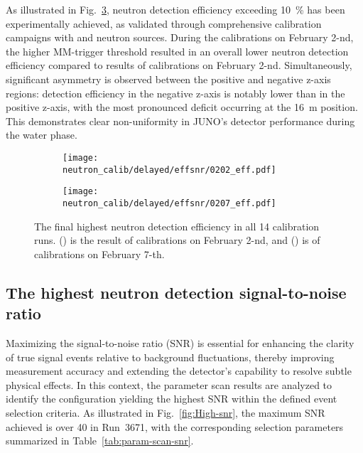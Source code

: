 As illustrated in Fig.~\ref{fig:SummaryEff}, neutron detection efficiency exceeding \SI{10}{\%} has been experimentally achieved, as validated through comprehensive calibration campaigns with  and  neutron sources. During the calibrations on February 2-nd, the higher MM-trigger threshold resulted in an overall lower neutron detection efficiency compared to results of calibrations on February 2-nd. Simultaneously, significant asymmetry is observed between the positive and negative z-axis regions: detection efficiency in the negative z-axis is notably lower than in the positive z-axis, with the most pronounced deficit occurring at the \SI{16}{m} position. This demonstrates clear non-uniformity in JUNO's detector performance during the water phase.
\begin{figure}[htbp]
	\begin{subfigure}{0.5\textwidth}
		\centering
		\texttt{[image: neutron\_calib/delayed/effsnr/0202\_eff.pdf]}
		\caption{}
		\label{fig:SummaryEff0202}
	\end{subfigure}%
	\begin{subfigure}{0.5\textwidth}
		\centering
		\texttt{[image: neutron\_calib/delayed/effsnr/0207\_eff.pdf]}
		\caption{}
		\label{fig:SummaryEff0207}
	\end{subfigure}
	\caption{The final highest neutron detection efficiency in all 14 calibration runs. () is the result of calibrations on February 2-nd, and () is of calibrations on February 7-th. }
	\label{fig:SummaryEff}
\end{figure}

\subsection{The highest neutron detection signal-to-noise ratio}
Maximizing the signal-to-noise ratio (SNR) is essential for enhancing the clarity of true signal events relative to background fluctuations, thereby improving measurement accuracy and extending the detector's capability to resolve subtle physical effects. In this context, the parameter scan results are analyzed to identify the configuration yielding the highest SNR within the defined event selection criteria. As illustrated in Fig.~\ref{fig:High-snr}, the maximum SNR achieved is over 40 in Run~3671, with the corresponding selection parameters summarized in Table~\ref{tab:param-scan-snr}.


